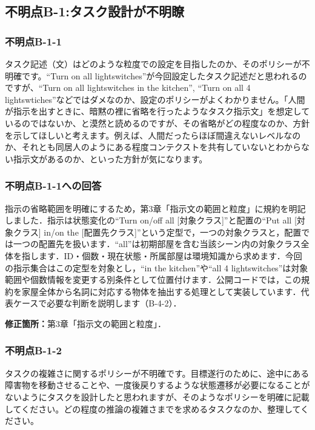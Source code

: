 \documentclass{jsarticle}
\begin{document}
\subsection*{不明点B-1:タスク設計が不明瞭}
\subsubsection*{不明点B-1-1}
\begin{screen}
タスク記述（文）はどのような粒度での設定を目指したのか、そのポリシーが不明確です。``Turn on all lightswitches''が今回設定したタスク記述だと思われるのですが、``Turn on all lightswitches in the kitchen'', ``Turn on all 4 lightswtiches''などではダメなのか、設定のポリシーがよくわかりません。「人間が指示を出すときに、暗黙の裡に省略を行ったようなタスク指示文」を想定しているのではないか、と漠然と読めるのですが、その省略がどの程度なのか、方針を示してほしいと考えます。例えば、人間だったらほぼ間違えないレベルなのか、それとも同居人のようにある程度コンテクストを共有していないとわからない指示文があるのか、といった方針が気になります。
\end{screen}

\subsubsection*{不明点B-1-1への回答}
指示の省略範囲を明確にするため，第3章「指示文の範囲と粒度」に規約を明記しました．指示は状態変化の``Turn on/off all [対象クラス]''と配置の``Put all [対象クラス] in/on the [配置先クラス]''という定型で，一つの対象クラスと，配置では一つの配置先を扱います．``all''は初期部屋を含む当該シーン内の対象クラス全体を指します．ID・個数・現在状態・所属部屋は環境知識から求めます．今回の指示集合はこの定型を対象とし，``in the kitchen''や``all 4 lightswitches''は対象範囲や個数情報を変更する別条件として位置付けます．公開コードでは，この規約を家屋全体から名詞に対応する物体を抽出する処理として実装しています．代表ケースで必要な判断を説明します（B-4-2）．

\noindent\textbf{修正箇所：}第3章「指示文の範囲と粒度」．


\subsubsection*{不明点B-1-2}
\begin{screen}
タスクの複雑さに関するポリシーが不明確です。目標遂行のために、途中にある障害物を移動させることや、一度後戻りするような状態遷移が必要になることがないようにタスクを設計したと思われますが、そのようなポリシーを明確に記載してください。どの程度の推論の複雑さまでを求めるタスクなのか、整理してください。
\end{screen}
\end{document}
